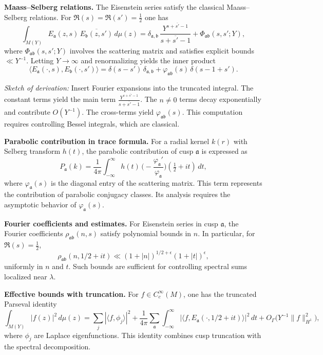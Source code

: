 \medskip

\noindent\textbf{Maass–Selberg relations.}
The Eisenstein series satisfy the classical Maass–Selberg relations.
For $\Re(s)=\Re(s')=\tfrac12$ one has
\[
  \int_{M(Y)} E_{\mathfrak{a}}(z,s)\,\overline{E_{\mathfrak{b}}(z,s')}\,d\mu(z)
  = \delta_{\mathfrak{a},\mathfrak{b}}\,\frac{Y^{s+\overline{s'}-1}}{s+\overline{s'}-1}
  + \Phi_{\mathfrak{a}\mathfrak{b}}(s,s';Y),
\]
where $\Phi_{\mathfrak{a}\mathfrak{b}}(s,s';Y)$ involves the scattering matrix
and satisfies explicit bounds $\ll Y^{-1}$.
Letting $Y\to\infty$ and renormalizing yields the inner product
\[
  \langle E_{\mathfrak{a}}(\cdot,s), E_{\mathfrak{b}}(\cdot,s')\rangle
  = \delta(s-s')\,\delta_{\mathfrak{a},\mathfrak{b}} + \varphi_{\mathfrak{a}\mathfrak{b}}(s)\,\delta(s-1+s').
\]

\medskip

\noindent
\emph{Sketch of derivation:}
Insert Fourier expansions into the truncated integral.
The constant terms yield the main term $\tfrac{Y^{s+\overline{s'}-1}}{s+\overline{s'}-1}$.
The $n\neq 0$ terms decay exponentially and contribute $O(Y^{-1})$.
The cross-terms yield $\varphi_{\mathfrak{a}\mathfrak{b}}(s)$.
This computation requires controlling Bessel integrals, which are classical.

\medskip

\noindent\textbf{Parabolic contribution in trace formula.}
For a radial kernel $k(r)$ with Selberg transform $h(t)$,
the parabolic contribution of cusp $\mathfrak{a}$ is expressed as
\[
  P_{\mathfrak{a}}(k)
  = \frac{1}{4\pi} \int_{-\infty}^{\infty} h(t)\,
    \Big(-\frac{\varphi_{\mathfrak{a}}'}{\varphi_{\mathfrak{a}}}\Big)(\tfrac12+it)\,dt,
\]
where $\varphi_{\mathfrak{a}}(s)$ is the diagonal entry of the scattering matrix.
This term represents the contribution of parabolic conjugacy classes.
Its analysis requires the asymptotic behavior of $\varphi_{\mathfrak{a}}(s)$.

\medskip

\noindent\textbf{Fourier coefficients and estimates.}
For Eisenstein series in cusp $\mathfrak{a}$, the Fourier coefficients
$\rho_{\mathfrak{a}\mathfrak{b}}(n,s)$ satisfy polynomial bounds in $n$.
In particular, for $\Re(s)=\tfrac12$,
\[
  \rho_{\mathfrak{a}\mathfrak{b}}(n,1/2+it) \ll (1+|n|)^{1/2+\epsilon}(1+|t|)^{\epsilon},
\]
uniformly in $n$ and $t$.
Such bounds are sufficient for controlling spectral sums localized near $\lambda$.

\medskip

\noindent\textbf{Effective bounds with truncation.}
For $f\in C^{\infty}_{c}(M)$,
one has the truncated Parseval identity
\[
  \int_{M(Y)} |f(z)|^{2}\,d\mu(z)
  = \sum_{j} |\langle f,\phi_{j}\rangle|^{2}
  + \frac{1}{4\pi}\sum_{\mathfrak{a}}\int_{-\infty}^{\infty}
    \big| \langle f,E_{\mathfrak{a}}(\cdot,1/2+it)\rangle \big|^{2}\,dt
  + O_{\Gamma}\!\big(Y^{-1}\|f\|^{2}_{H^{1}}\big),
\]
where $\phi_{j}$ are Laplace eigenfunctions.
This identity combines cusp truncation with the spectral decomposition.

